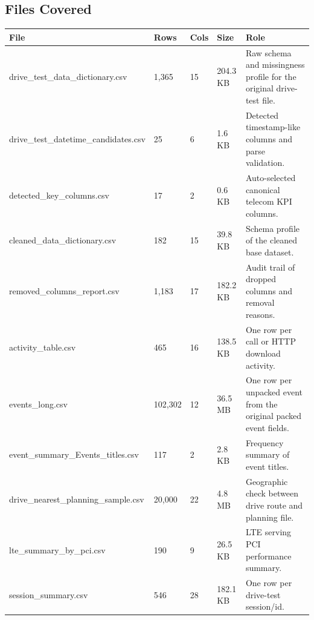 \documentclass[12pt,a4paper]{article}
\begin{document}
\subsection{Files Covered}
\begin{landscape}
\begin{center}
\begin{tabularx}{\linewidth}{P{5.8cm}C{1.5cm}C{1.0cm}C{1.6cm}Y}
\toprule
\textbf{File} & \textbf{Rows} & \textbf{Cols} & \textbf{Size} & \textbf{Role} \\
\midrule
{\ttfamily drive\_\allowbreak{}test\_\allowbreak{}data\_\allowbreak{}dictionary.\allowbreak{}csv} & 1,365 & 15 & 204.3 KB & Raw schema and missingness profile for the original drive-test file. \\
{\ttfamily drive\_\allowbreak{}test\_\allowbreak{}datetime\_\allowbreak{}candidates.\allowbreak{}csv} & 25 & 6 & 1.6 KB & Detected timestamp-like columns and parse validation. \\
{\ttfamily detected\_\allowbreak{}key\_\allowbreak{}columns.\allowbreak{}csv} & 17 & 2 & 0.6 KB & Auto-selected canonical telecom KPI columns. \\
{\ttfamily cleaned\_\allowbreak{}data\_\allowbreak{}dictionary.\allowbreak{}csv} & 182 & 15 & 39.8 KB & Schema profile of the cleaned base dataset. \\
{\ttfamily removed\_\allowbreak{}columns\_\allowbreak{}report.\allowbreak{}csv} & 1,183 & 17 & 182.2 KB & Audit trail of dropped columns and removal reasons. \\
{\ttfamily activity\_\allowbreak{}table.\allowbreak{}csv} & 465 & 16 & 138.5 KB & One row per call or HTTP download activity. \\
{\ttfamily events\_\allowbreak{}long.\allowbreak{}csv} & 102,302 & 12 & 36.5 MB & One row per unpacked event from the original packed event fields. \\
{\ttfamily event\_\allowbreak{}summary\_\allowbreak{}Events\_\allowbreak{}titles.\allowbreak{}csv} & 117 & 2 & 2.8 KB & Frequency summary of event titles. \\
{\ttfamily drive\_\allowbreak{}nearest\_\allowbreak{}planning\_\allowbreak{}sample.\allowbreak{}csv} & 20,000 & 22 & 4.8 MB & Geographic check between drive route and planning file. \\
{\ttfamily lte\_\allowbreak{}summary\_\allowbreak{}by\_\allowbreak{}pci.\allowbreak{}csv} & 190 & 9 & 26.5 KB & LTE serving PCI performance summary. \\
{\ttfamily session\_\allowbreak{}summary.\allowbreak{}csv} & 546 & 28 & 182.1 KB & One row per drive-test session/id. \\

\end{tabularx}
\end{center}
\end{landscape}
\end{document}
